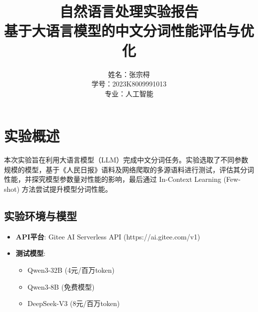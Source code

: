 \documentclass[a4paper,12pt]{ctexart} %
\title{\textbf{自然语言处理实验报告}\\ \large 基于大语言模型的中文分词性能评估与优化}
\author{姓名：张宗桪 \\ 学号：2023K8009991013 \\ 专业：人工智能}
\begin{document}
\maketitle
\thispagestyle{empty} 
\newpage 

\pagestyle{plain}
\tableofcontents
\newpage 

\pagestyle{fancy} 
\fancyhf{} 
\fancyfoot[C]{\thepage} 
\setlength{\parskip}{0.5em} 


\section{实验概述}
本次实验旨在利用大语言模型（LLM）完成中文分词任务。实验选取了不同参数规模的模型，基于《人民日报》语料及网络爬取的多源语料进行测试，评估其分词性能，并探究模型参数量对性能的影响，最后通过 In-Context Learning (Few-shot) 方法尝试提升模型分词性能。

\subsection{实验环境与模型}
\begin{itemize}
    \item \textbf{API平台}: Gitee AI Serverless API (https://ai.gitee.com/v1)
    \item \textbf{测试模型}: 
    \begin{itemize}
        \item Qwen3-32B (4元/百万token)
        \item Qwen3-8B (免费模型)
        \item DeepSeek-V3 (8元/百万token)
    \end{itemize}
\end{itemize}
\end{document}
